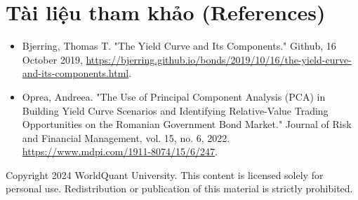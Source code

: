 \section*{Tài liệu tham khảo (References)}

\begin{itemize}
    \item Bjerring, Thomas T. "The Yield Curve and Its Components." Github, 16 October 2019, \url{https://bjerring.github.io/bonds/2019/10/16/the-yield-curve-and-its-components.html}.
    \item Oprea, Andreea. "The Use of Principal Component Analysis (PCA) in Building Yield Curve Scenarios and Identifying Relative-Value Trading Opportunities on the Romanian Government Bond Market." Journal of Risk and Financial Management, vol. 15, no. 6, 2022. \url{https://www.mdpi.com/1911-8074/15/6/247}.
\end{itemize}

Copyright 2024 WorldQuant University. This content is licensed solely for personal use. Redistribution or publication of this material is strictly prohibited.
